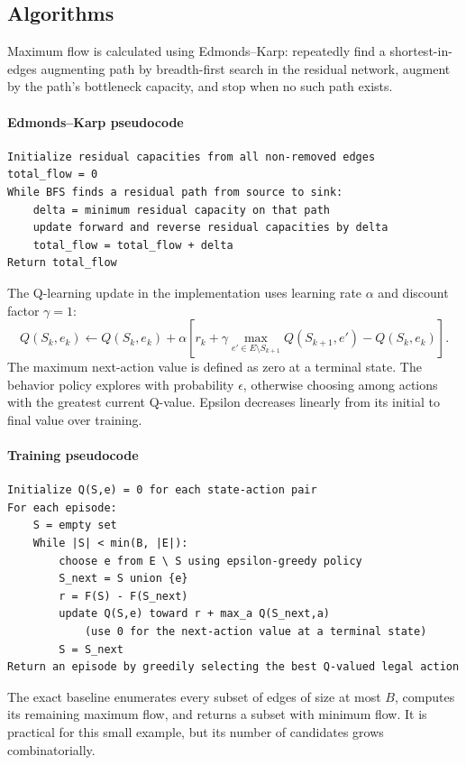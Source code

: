 \documentclass[11pt]{article}
\begin{document}
\subsection{Algorithms}
Maximum flow is calculated using Edmonds--Karp: repeatedly find a
shortest-in-edges augmenting path by breadth-first search in the residual
network, augment by the path's bottleneck capacity, and stop when no such
path exists.

\paragraph{Edmonds--Karp pseudocode}
\begin{verbatim}
Initialize residual capacities from all non-removed edges
total_flow = 0
While BFS finds a residual path from source to sink:
    delta = minimum residual capacity on that path
    update forward and reverse residual capacities by delta
    total_flow = total_flow + delta
Return total_flow
\end{verbatim}

The Q-learning update in the implementation uses learning rate \(\alpha\)
and discount factor \(\gamma=1\):
\[
Q(S_k,e_k)\leftarrow Q(S_k,e_k)+
\alpha\left[r_k+\gamma\max_{e'\in E\setminus S_{k+1}}
Q(S_{k+1},e')-Q(S_k,e_k)\right].
\]
The maximum next-action value is defined as zero at a terminal state. The
behavior policy explores with probability \(\epsilon\), otherwise choosing
among actions with the greatest current Q-value. Epsilon decreases linearly
from its initial to final value over training.

\paragraph{Training pseudocode}
\begin{verbatim}
Initialize Q(S,e) = 0 for each state-action pair
For each episode:
    S = empty set
    While |S| < min(B, |E|):
        choose e from E \ S using epsilon-greedy policy
        S_next = S union {e}
        r = F(S) - F(S_next)
        update Q(S,e) toward r + max_a Q(S_next,a)
            (use 0 for the next-action value at a terminal state)
        S = S_next
Return an episode by greedily selecting the best Q-valued legal action
\end{verbatim}

The exact baseline enumerates every subset of edges of size at most \(B\),
computes its remaining maximum flow, and returns a subset with minimum flow.
It is practical for this small example, but its number of candidates grows
combinatorially.
\end{document}
